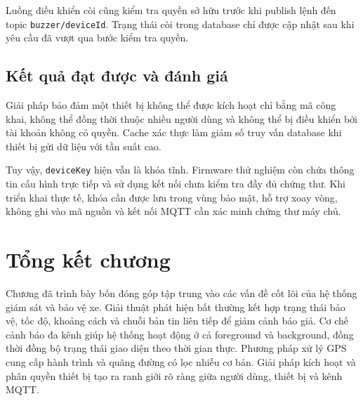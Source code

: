 \documentclass[../DoAn.tex]{subfiles}
\begin{document}
Luồng điều khiển còi cũng kiểm tra quyền sở hữu trước khi publish lệnh đến topic
\texttt{buzzer/deviceId}. Trạng thái còi trong database chỉ được cập nhật sau
khi yêu cầu đã vượt qua bước kiểm tra quyền.

\subsection{Kết quả đạt được và đánh giá}

Giải pháp bảo đảm một thiết bị không thể được kích hoạt chỉ bằng mã công khai,
không thể đồng thời thuộc nhiều người dùng và không thể bị điều khiển bởi tài
khoản không có quyền. Cache xác thực làm giảm số truy vấn database khi thiết bị
gửi dữ liệu với tần suất cao.

Tuy vậy, \texttt{deviceKey} hiện vẫn là khóa tĩnh. Firmware thử nghiệm còn chứa
thông tin cấu hình trực tiếp và sử dụng kết nối chưa kiểm tra đầy đủ chứng thư.
Khi triển khai thực tế, khóa cần được lưu trong vùng bảo mật, hỗ trợ xoay vòng,
không ghi vào mã nguồn và kết nối MQTT cần xác minh chứng thư máy chủ.

\section{Tổng kết chương}

Chương đã trình bày bốn đóng góp tập trung vào các vấn đề cốt lõi của hệ thống
giám sát và bảo vệ xe. Giải thuật phát hiện bất thường kết hợp trạng thái bảo vệ,
tốc độ, khoảng cách và chuỗi bản tin liên tiếp để giảm cảnh báo giả. Cơ chế cảnh
báo đa kênh giúp hệ thống hoạt động ở cả foreground và background, đồng thời
đồng bộ trạng thái giao diện theo thời gian thực. Phương pháp xử lý GPS cung cấp
hành trình và quãng đường có lọc nhiễu cơ bản. Giải pháp kích hoạt và phân quyền
thiết bị tạo ra ranh giới rõ ràng giữa người dùng, thiết bị và kênh MQTT.
\end{document}
